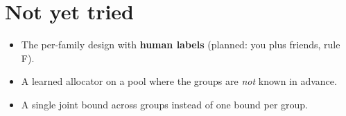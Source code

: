 \documentclass[11pt]{article}
\begin{document}
\section*{Not yet tried}

\begin{itemize}
\item The per-family design with \textbf{human labels} (planned: you plus friends, rule F).
\item A learned allocator on a pool where the groups are \emph{not} known in advance.
\item A single joint bound across groups instead of one bound per group.
\end{itemize}
\end{document}
